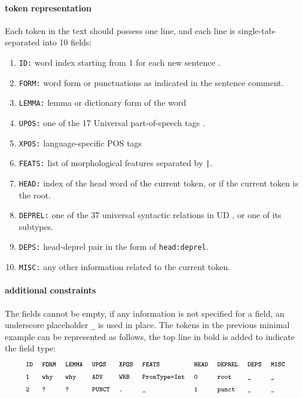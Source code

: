 \paragraph{token representation} 
Each token in the text should possess one line, and each line is single-tab-separated into 10 fields:
\begin{enumerate}
	\item \texttt{ID:} word index starting from 1 for each new sentence .
	\item \texttt{FORM:} word form or punctuations as indicated in the sentence comment.
	\item \texttt{LEMMA:} lemma or dictionary form of the word
	\item \texttt{UPOS:} one of the 17 Universal part-of-speech tags .
	\item \texttt{XPOS:} language-specific POS tags
	\item \texttt{FEATS:} list of morphological features  separated by \texttt{|}.
	\item \texttt{HEAD:} index of the head word of the current token, or  if the current token is the root.
	\item \texttt{DEPREL:} one of the 37 universal syntactic relations in UD , or one of its subtypes.
	\item \texttt{DEPS:} head-deprel pair in the form of \texttt{head:deprel}.
	\item \texttt{MISC:} any other information related to the current token.
\end{enumerate}
\paragraph{additional constraints} The fields cannot be empty, if any information  is not specified for a field, an underscore placeholder \texttt{\_} is used in place.
The tokens in the previous minimal example can be represented as follows, the top line in bold is added to indicate the field type:
\begin{align*}
&\footnotesize\texttt{\textbf{ID}}&\hspace{0.1em}&\footnotesize\texttt{\textbf{FORM}}&\hspace{0.1em}&\footnotesize\texttt{\textbf{LEMMA}}&\hspace{0.1em}&\footnotesize\texttt{\textbf{UPOS}}&\hspace{0.1em}&\footnotesize\texttt{\textbf{XPOS}}&\hspace{0.1em}&\footnotesize\texttt{\textbf{FEATS}}&\hspace{0.1em}&\footnotesize\texttt{\textbf{HEAD}}&\hspace{0.1em}&\footnotesize\texttt{\textbf{DEPREL}}&\hspace{0.1em}&\footnotesize\texttt{\textbf{DEPS}}&\hspace{0.1em}&\footnotesize\texttt{\textbf{MISC}}\\
&\footnotesize\texttt{1}&\hspace{0.1em}&\footnotesize\texttt{why}&\hspace{0.1em}&\footnotesize\texttt{why}&\hspace{0.1em}&\footnotesize\texttt{ADV}&\hspace{0.1em}&\footnotesize\texttt{WRB}&\hspace{0.1em}&\footnotesize\texttt{PronType=Int}&\hspace{0.1em}&\footnotesize\texttt{0}&\hspace{0.1em}&\footnotesize\texttt{root}&\hspace{0.1em}&\footnotesize\texttt{\_}&\hspace{0.1em}&\footnotesize\texttt{\_}\\
&\footnotesize\texttt{2}&\hspace{0.1em}&\footnotesize\texttt{?}&\hspace{0.1em}&\footnotesize\texttt{?}&\hspace{0.1em}&\footnotesize\texttt{PUNCT}&\hspace{0.1em}&\footnotesize\texttt{.}&\hspace{0.1em}&\footnotesize\texttt{\_}&\hspace{0.1em}&\footnotesize\texttt{1}&\hspace{0.1em}&\footnotesize\texttt{punct}&\hspace{0.1em}&\footnotesize\texttt{\_}&\hspace{0.1em}&\footnotesize\texttt{\_}
\end{align*}

